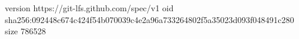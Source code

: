 version https://git-lfs.github.com/spec/v1
oid sha256:092448c674c424f54b070039c4e2a96a733264802f5a35023d093f048491c280
size 786528
